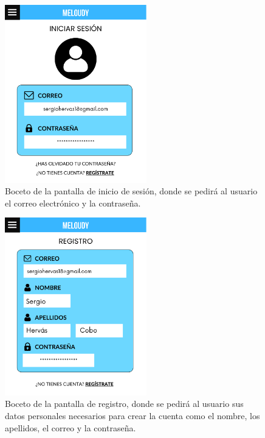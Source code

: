 \begin{figure}[H]
    \centering
    \centerline{\includegraphics[width=0.55\textwidth, frame]{imagenes/c6/9.png}}
    \caption{Boceto de la pantalla de inicio de sesión, donde se pedirá al usuario el correo electrónico y la contraseña.}
    \label{fig:login}
\end{figure}

\begin{figure}[H]
    \centering
    \centerline{\includegraphics[width=0.55\textwidth, frame]{imagenes/c6/10.png}}
    \caption{Boceto de la pantalla de registro, donde se pedirá al usuario sus datos personales necesarios para crear la cuenta como el nombre, los apellidos, el correo y la contraseña.}
    \label{fig:registro}
\end{figure}